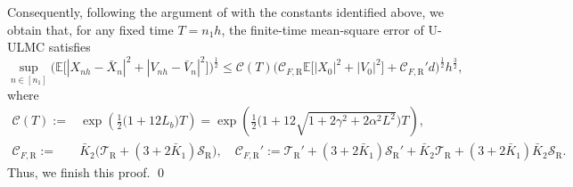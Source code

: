 \documentclass[12pt]{article}
\numberwithin{equation}{section}
\renewenvironment{proof}%
  {\begin{trivlist}%
   \item[]\ignorespaces}%
  {\qed\end{trivlist}}
\newcommand{\E}{\mathbb{E}}
\begin{document}
\begin{proof}
Consequently, following the argument of \cite[Theorem 3.3]{yang2025non} with the constants identified above, we obtain that, for any fixed time \(T=n_1h\), the finite-time mean-square error of U-ULMC satisfies
\begin{equation}
\label{eq:finite-time-mean-square-error-U-ULMC}
\sup_{n\in [n_1]}
\Bigg(
\mathbb E
\Big[
|X_{nh}-\bar X_{n}|^2
+
|V_{nh}-\bar V_{n}|^2
\Big]
\Bigg)
^{\frac{1}{2}}
\leq
\mathcal C(T)
\Big(
\mathcal C_{F,\mathrm{R}}
\E
\big[
|X_0|^2+|V_0|^2
\big]
+
\mathcal C_{F,\mathrm{R}}'d
\Big)^{\frac{1}{2}}
h^{\frac{3}{2}},
\end{equation}
where 
\begin{equation}
\label{eq:constants-mathcalC(T)-and}
\begin{aligned}
\mathcal C (T)
:=  &
\exp\left(
\tfrac12
\big(
1+12L_b
\big)T
\right)
=
\exp\left(
\tfrac12
\big(
1+12\sqrt{1+2\gamma^2+2\alpha^2L^2}
\big)T
\right)
,
\\
\mathcal C_{F,\mathrm{R}}
:=  &
\bar K_2
\big(
\mathcal T_{\mathrm{R}}
+
(3+2\bar K_1)\mathcal S_{\mathrm{R}}
\big)
,
\quad 
\mathcal C_{F,\mathrm{R}}'
:=  
\mathcal T_{\mathrm{R}}'
+
(3+2\bar K_1)\mathcal S_{\mathrm{R}}'
+
\bar K_2\mathcal T_{\mathrm{R}}
+
(3+2\bar K_1)\bar K_2\mathcal S_{\mathrm{R}}
.
\end{aligned}
\end{equation}
Thus, we finish this proof.
\end{proof}
\end{document}
